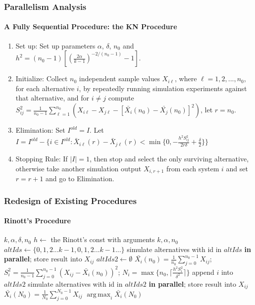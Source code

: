 \documentclass{beamer}
\DeclareMathOperator*{\argmax}{arg\,max}
\begin{document}
\begin{frame}
\frametitle{Parallelism Analysis}
\framesubtitle{A Fully Sequential Procedure: the KN Procedure}
\begin{enumerate}
\item{Set up: } Set up parameters $\alpha$, $\delta$, $n_0$ and $h^2 = (n_0 -1)[(\frac{2\alpha}{k - 1})^{-2/(n_0-1)} - 1]$.
\item{Initialize: } Collect $n_0$ independent sample values $X_{i\ell}$, where $\ell = 1, 2,...,n_0$, for each alternative $i$, by repeatedly running simulation experiments against that alternative, and for $i \neq j$ compute $S_{ij}^2 = \frac{1}{n_0 - 1}\sum_{\ell=1}^{n_0}(X_{i\ell} - X_{j\ell} - [\bar{X_i}(n_0) - \bar{X_j}(n_0)]^2)$, let $r = n_0$.
\item{Elimination: } Set $I^{old} = I$. Let $I = I^{old} - \{i \in I^{old}: \bar{X}_{i\ell}(r) - \bar{X}_{j\ell}(r) < \min\{0, - \frac{h^2S_{ij}^2}{2r\delta} + \frac{\delta}{2} \} \}$
\item{Stopping Rule: } If $|I| = 1$, then stop and select the only surviving alternative, otherwise take another simulation output $X_{i,r+1}$ from each system $i$ and set $r = r + 1$ and go to Elimination.
\end{enumerate}
\end{frame}

\begin{frame}
\frametitle{Redesign of Existing Procedures}
\framesubtitle{Rinott's Procedure}
\begin{algorithmic}[1]
\Require $k, \alpha, \delta, n_0$
\State $h \gets$ the Rinott's const with arguments $k, \alpha, n_0$
\State $altIds \gets \{0, 1, 2...k - 1, 0, 1, 2...k - 1...\}$ 
\State simulate alternatives with id in $altIds$ \textbf{in parallel}; store result into $X_{ij}$
\State $altIds2 \gets \emptyset$
  \State $\bar{X_i}(n_0) = \frac{1}{n_0} \sum_{j=0}^{n_0 - 1}X_{ij}$;  $S_i^2 = \frac{1}{n_0 - 1} \sum_{j=0}^{n_0 - 1}(X_{ij} - \bar{X_i}(n_0))^2$;
  \State $N_i = \max\{n_0, \lceil \frac{h^2S_i^2}{\delta^2} \rceil\}$
    \State append $i$ into $altIds2$
  \EndFor
\EndFor
\State simulate alternatives with id in $altIds2$ \textbf{in parallel}; store result into $X_{ij}$
  \State $\bar{X_i}(N_0) = \frac{1}{N_0} \sum_{j=0}^{N_0 - 1}X_{ij}$
\EndFor
\State \Return $\argmax_{i}\bar{X_i}(N_0)$
\end{algorithmic}
\end{frame}
\end{document}
